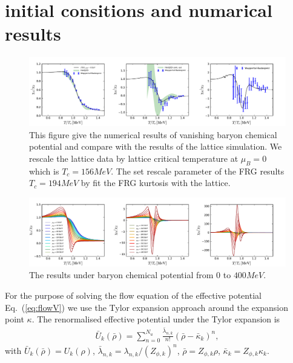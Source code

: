 \documentclass[%
reprint,
superscriptaddress,
showpacs,preprintnumbers,
 amsmath,amssymb,
 aps,
prd,
]{revtex4-1}
\def\Eq#1{Eq.~(\ref{#1})}
\begin{document}
\section{initial consitions and numarical results}
\label{sec:NR}
%
\begin{figure}[t]
\includegraphics[width=1\textwidth]{mub0}
\caption{This figure give the numerical results of vanishing baryon chemical potential and compare with the results of the lattice simulation. We rescale the lattice data by lattice critical temperature at $\mu_B=0$ which is $T_c=156MeV$. The set rescale parameter of the FRG results $T_c=194MeV$ by fit the FRG kurtosis with the lattice.}\label{fig:mub0}
\end{figure}
%
%
\begin{figure}[t]
\includegraphics[width=1\textwidth]{finmub}
\caption{The results under baryon chemical potential from $0$ to $400MeV$.}\label{fig:finmu}
\end{figure}
%
For the purpose of solving the flow equation of the effective potential \Eq{eq:flowV} we use the Tylor expansion approach around the expansion point $\kappa$. The renormalised effective potential under the Tylor expansion is
\begin{align}
\bar{U}_k(\bar{\rho})=\sum^{N_u}_{n=0}\frac{\bar{\lambda}_{n,k}}{n!}(\bar{\rho}-\bar{\kappa}_k)^n,\label{eq:Tylor}
\end{align}
with $\bar{U}_k(\bar{\rho})=U_k(\rho)$, $\bar{\lambda}_{n,k}=\lambda_{n,k}/(Z_{\phi,k})^n$, $\bar{\rho}=Z_{\phi,k}\rho$, $\bar{\kappa}_k=Z_{\phi,k}\kappa_k$.
\end{document}
